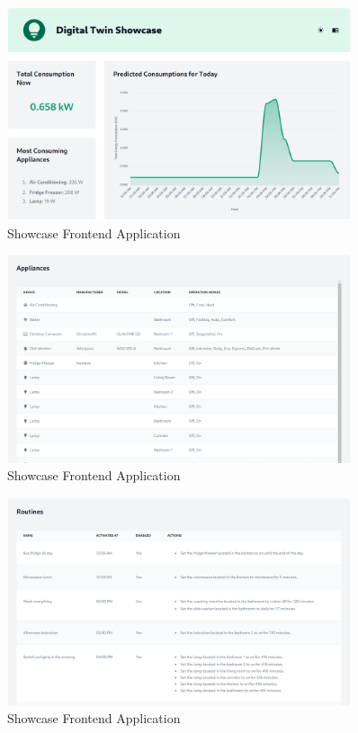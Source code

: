 \begin{figure}
    \centering
    \includegraphics[width=0.9\textwidth]{images/frontend/header.png}
    \caption{Showcase Frontend Application}
    \label{fig:frontend_header}
\end{figure}

\begin{figure}
    \centering
    \includegraphics[width=0.9\textwidth]{images/frontend/appliances.png}
    \caption{Showcase Frontend Application}
    \label{fig:frontend_appliances}
\end{figure}

\begin{figure}
    \centering
    \includegraphics[width=0.9\textwidth]{images/frontend/routines.png}
    \caption{Showcase Frontend Application}
    \label{fig:frontend_routines}
\end{figure}